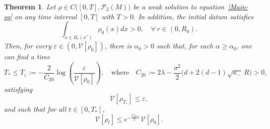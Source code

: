 \documentclass[11pt]{amsart}
\newtheorem{theorem}{Theorem}[section]
\begin{document}
\begin{theorem}\label{thm:convergence}
Let $\rho \in C\bigl([0,T], \mathcal{P}_2(M)\bigr)$ be a weak solution to equation~\eqref{Main-eq} on any time interval $[0,T]$ with $T>0$.  In addition, the initial datum satisfies
\[
\int_{x\in B_r(x^*)} \rho_0(x) dx >0,\quad \forall~r\in (0,R_0).
\]
Then, for every $\varepsilon\in (0,\mathcal V[\rho_0])$, there is $\alpha_0>0$ such that, for each $\alpha\ge \alpha_0$, one can find a time 
\[
T_* \leq T_\varepsilon := -\frac{2}{C_{20}} \log\!\left( \frac{\varepsilon}{\mathcal{V}[\rho_0]} \right),
\quad \text{where} \quad
C_{20} := 2\lambda - \frac{\sigma^2}{2} \bigl(d + 2(d-1)\sqrt{\kappa_-}\, R\bigr) > 0,
\]
satisfying
\[
\mathcal{V}[\rho_{T_*}] \leq \varepsilon,
\]
and such that for all $t \in [0, T_*]$,
\[
\mathcal{V}[\rho_t] \leq e^{-\frac{C_{20}}{2} t} \, \mathcal{V}[\rho_0].
\]
\end{theorem}
\end{document}
